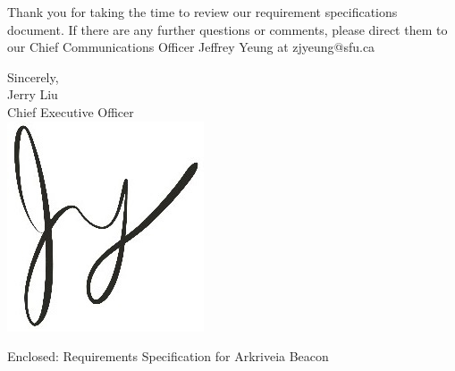 \documentclass[11pt]{letter}
\begin{document}
\begin{letter}
\medskip
Thank you for taking the time to review our requirement specifications document. If there are any further questions or comments, please direct them to our Chief Communications Officer Jeffrey Yeung at zjyeung@sfu.ca

\medskip
Sincerely,\\
Jerry Liu\\
Chief Executive Officer\\

\vspace*{-0.25cm}
\includegraphics[scale=0.8]{./images/signature.jpg}

{Enclosed: Requirements Specification for Arkriveia Beacon}

\end{letter}
\end{document}
